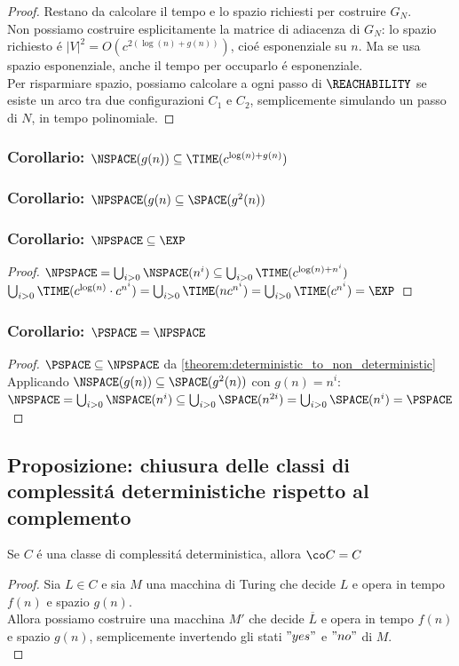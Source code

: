 \begin{proof}
Restano da calcolare il tempo e lo spazio richiesti per costruire $G_N$. \\

Non possiamo costruire esplicitamente la matrice di adiacenza di $G_N$:
lo spazio richiesto é $|V|^2 = O(c^{2(\log(n) + g(n))})$, cioé esponenziale su $n$.
Ma se usa spazio esponenziale, anche il tempo per occuparlo é esponenziale. \\

Per risparmiare spazio, possiamo calcolare a ogni passo di $\REACHABILITY$ 
se esiste un arco tra due configurazioni $C_1$ e $C_2$,
semplicemente simulando un passo di $N$, in tempo polinomiale.
\end{proof}
\subsubsection{Corollario: $\NSPACE(g(n)) \subseteq \TIME(c^{\log(n) + g(n)})$}
\subsubsection{Corollario: $\NPSPACE(g(n) \subseteq \SPACE(g^2(n))$}
\subsubsection{Corollario: $\NPSPACE \subseteq \EXP$}
\begin{proof}
$
\NPSPACE = \bigcup_{i>0} \NSPACE(n^i) \subseteq \bigcup_{i>0} \TIME(c^{\log(n) + n^i})$ \\
$\bigcup_{i>0} \TIME(c^{\log(n)} \cdot c^{n^i}) = \bigcup_{i>0} \TIME(n c^{n^i}) = \bigcup_{i>0} \TIME(c^{n^i}) = \EXP
$
\end{proof}
\subsubsection{Corollario: $\PSPACE = \NPSPACE$}
\begin{proof}
$\PSPACE \subseteq \NPSPACE$ da \ref{theorem:deterministic_to_non_deterministic} \\
Applicando $\NSPACE(g(n)) \subseteq \SPACE(g^2(n))$ con $g(n) = n^i$: \\
$\NPSPACE = \bigcup_{i>0} \NSPACE(n^i) \subseteq \bigcup_{i>0} \SPACE(n^{2i}) = \bigcup_{i>0} \SPACE(n^i) = \PSPACE$
\end{proof}

\subsection{Proposizione: chiusura delle classi di complessitá deterministiche rispetto al complemento}
Se $C$ é una classe di complessitá deterministica, allora $\co C = C$
\begin{proof}
Sia $L \in C$ e sia $M$ una macchina di Turing che decide $L$ e opera in tempo $f(n)$ e spazio $g(n)$. \\
Allora possiamo costruire una macchina $M'$ che decide $\overline{L}$ e opera in tempo $f(n)$ e spazio $g(n)$, semplicemente invertendo gli stati $"yes"$ e $"no"$  di $M$. \\
\end{proof}
